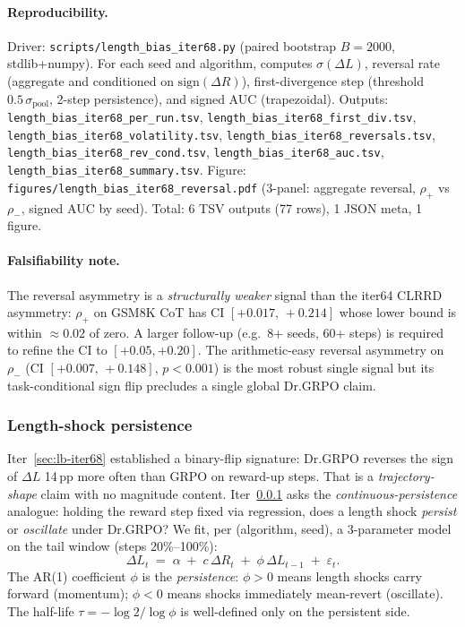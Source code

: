 \documentclass{article}
\begin{document}
\paragraph{Reproducibility.}
Driver: \texttt{scripts/length\_bias\_iter68.py} (paired bootstrap
$B=2000$, stdlib+numpy). For each seed and algorithm, computes
$\sigma(\Delta L)$, reversal rate (aggregate and conditioned on
$\mathrm{sign}(\Delta R)$), first-divergence step (threshold
$0.5\,\sigma_{\mathrm{pool}}$, 2-step persistence), and signed AUC
(trapezoidal). Outputs:
\texttt{length\_bias\_iter68\_per\_run.tsv},
\texttt{length\_bias\_iter68\_first\_div.tsv},
\texttt{length\_bias\_iter68\_volatility.tsv},
\texttt{length\_bias\_iter68\_reversals.tsv},
\texttt{length\_bias\_iter68\_rev\_cond.tsv},
\texttt{length\_bias\_iter68\_auc.tsv},
\texttt{length\_bias\_iter68\_summary.tsv}. Figure:
\texttt{figures/length\_bias\_iter68\_reversal.pdf} (3-panel:
aggregate reversal, $\rho_+$ vs $\rho_{-}$, signed AUC by seed).
Total: 6 TSV outputs (77 rows), 1 JSON meta, 1 figure.

\paragraph{Falsifiability note.}
The reversal asymmetry is a \emph{structurally weaker} signal than
the iter64 CLRRD asymmetry: $\rho_+$ on GSM8K CoT has CI
$[+0.017,\, +0.214]$ whose lower bound is within $\approx 0.02$ of
zero. A larger follow-up (e.g.\ 8+ seeds, 60+ steps) is required to
refine the CI to $[+0.05, +0.20]$. The arithmetic-easy reversal
asymmetry on $\rho_{-}$ (CI $[+0.007,\, +0.148]$, $p < 0.001$) is the
most robust single signal but its task-conditional sign flip
precludes a single global Dr.GRPO claim. 

\subsubsection{Length-shock persistence}\label{sec:lb-iter72}

Iter~\ref{sec:lb-iter68} established a binary-flip signature: Dr.GRPO
reverses the sign of $\Delta L$ 14\,pp more often than GRPO on reward-up
steps. That is a \emph{trajectory-shape} claim with no magnitude content.
Iter~\ref{sec:lb-iter72} asks the \emph{continuous-persistence} analogue:
holding the reward step fixed via regression, does a length shock
\emph{persist} or \emph{oscillate} under Dr.GRPO? We fit, per
(algorithm, seed), a 3-parameter model on the tail window (steps
20\%--100\%):
\begin{equation}\label{eq:lb72-ar1}
\Delta L_t \;=\; \alpha \;+\; c\, \Delta R_t \;+\; \phi\, \Delta L_{t-1} \;+\; \varepsilon_t .
\end{equation}
The AR(1) coefficient $\phi$ is the \emph{persistence}: $\phi > 0$ means
length shocks carry forward (momentum); $\phi < 0$ means shocks
immediately mean-revert (oscillate). The half-life
$\tau = -\log 2 / \log \phi$ is well-defined only on the persistent side.
\end{document}
